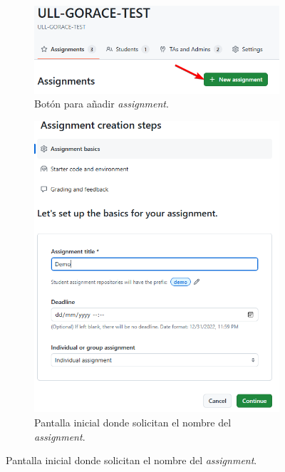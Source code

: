 \begin{figure}
    \centering
    \begin{subfigure}{0.24\textwidth}
        \includegraphics[width=\linewidth]{images/ghc-new-assig.btn.png}
        \caption{Botón para añadir \textit{assignment}.}
        \label{fig:ghc-new-assig-btn}
    \end{subfigure}
    \hspace*{\fill}   %
    \begin{subfigure}{0.24\textwidth}
        \includegraphics[width=1\linewidth]{images/ghc-new-assig-1.png}
        \caption{Pantalla inicial donde solicitan el nombre del \textit{assignment}.}

\end{subfigure}
\end{figure}
